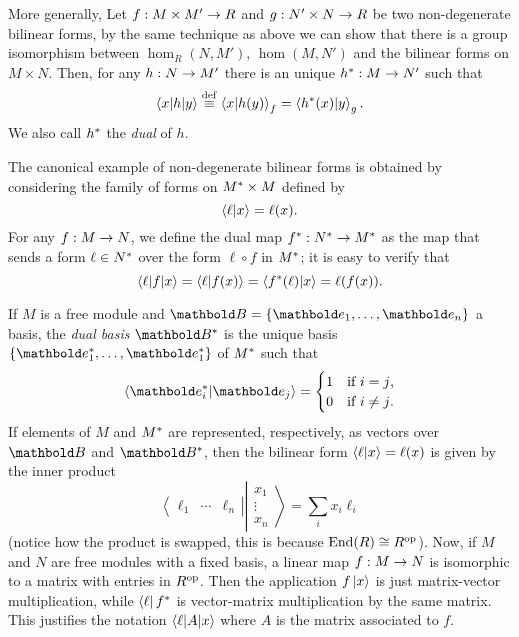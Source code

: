 More generally, Let $f:M\times M'\rightarrow R$ and $g:N'\times N\rightarrow R$ be two
non-degenerate bilinear forms, by the same technique as above we can
show that there is a group isomorphism between $\hom_R(N,M')$,
$\hom(M,N')$ and the bilinear forms on $M\times N$. Then, for any
$h:N\rightarrow M'$ there is an unique $h^\ast:M\rightarrow N'$ such that
\[\left\langle x \middle| h \middle| y \right\rangle\overset{\mathrm{def}}{\equiv}\left\langle x \middle| h(y) \right\rangle_f = \left\langle h^\ast(x) \middle| y \right\rangle_g 
\text{.}\]
We also call $h^\ast$ the \emph{dual} of $h$.

The canonical example of non-degenerate bilinear forms is obtained by
considering the family of forms on $M^\ast\times M$ defined by
\[\left\langle \ell \middle| x \right\rangle = \ell(x) \text{.}\]
For any $f:M\rightarrow N$, we define the dual map
$f^\ast:N^\ast\rightarrow M^\ast$ as the map that sends a form
$\ell\in N^\ast$ over the form $\ell\circ f$ in $M^\ast$; it is
easy to verify that
\[\left\langle \ell \middle| f \middle| x \right\rangle =  \left\langle \ell \middle| f(x) \right\rangle = \left\langle f^\ast(\ell) \middle| x \right\rangle
= \ell(f(x))\text{.}\]


  If $M$ is a free module and
$\basis{B}=\{\basis{e}_1,\ldots,\basis{e}_n\}$ a basis, the
\emph{dual
  basis}
$\dual{\basis{B}}$ is the unique basis
$\{\dual{\basis{e}_1},\ldots,\dual{\basis{e}_1}\}$ of $M^\ast$ such
that
\begin{equation*}
  \braket{\dual{\basis{e}_i}}{\basis{e}_j} =
  \begin{cases}
    1 &\text{if $i=j$,}\\
    0 &\text{if $i\ne j$.}
  \end{cases}
\end{equation*}
If elements of $M$ and $M^\ast$ are represented, respectively, as
vectors over $\basis{B}$ and $\dual{\basis{B}}$, then the bilinear
form $\left\langle \ell \middle| x \right\rangle=\ell(x)$ is given by the inner product
\begin{equation*}
  \left\langle\begin{matrix}
      \ell_1 &\cdots & \ell_n
    \end{matrix}\right\rvert
  \left\lvert\begin{matrix}
    x_1\\
    \vdots\\
    x_n
  \end{matrix}\right\rangle
  =
  \sum_i x_i\ell_i
\end{equation*}
(notice how the product is swapped, this is because $\operatorname{End}(R)\cong
R^{\mathrm{op}}$).  Now, if $M$ and $N$ are free modules with a fixed basis, a
linear map $f:M\rightarrow N$ is isomorphic to a matrix with entries in
$R^{\mathrm{op}}$. Then the application $f\left\lvert x \right\rangle$ is just matrix-vector
multiplication, while $\left\langle \ell \right\rvert f^\ast$ is vector-matrix
multiplication by the same matrix. This justifies the notation
$\left\langle \ell \middle| A \middle| x \right\rangle$ where $A$ is the matrix associated to
$f$.


